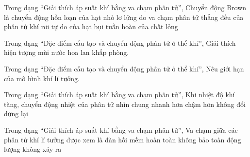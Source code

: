 \begin{ex}
Trong dạng “Giải thích áp suất khí bằng va chạm phân tử”, Chuyển động Brown là chuyển động
\choice
{\True hỗn loạn của hạt nhỏ lơ lửng do va chạm phân tử}
{thẳng đều của phân tử khí}
{rơi tự do của hạt bụi}
{tuần hoàn của chất lỏng}
\end{ex}

\begin{ex}
Trong dạng “Đặc điểm cấu tạo và chuyển động phân tử ở thể khí”, Giải thích hiện tượng mùi nước hoa lan khắp phòng.
\choiceTF

\end{ex}

\begin{ex}
Trong dạng “Đặc điểm cấu tạo và chuyển động phân tử ở thể khí”, Nêu giới hạn của mô hình khí lí tưởng.
\choiceTF

\end{ex}

\begin{ex}
Trong dạng “Giải thích áp suất khí bằng va chạm phân tử”, Khi nhiệt độ khí tăng, chuyển động nhiệt của phân tử nhìn chung
\choice
{\True nhanh hơn}
{chậm hơn}
{không đổi}
{dừng lại}
\end{ex}

\begin{ex}
Trong dạng “Giải thích áp suất khí bằng va chạm phân tử”, Va chạm giữa các phân tử khí lí tưởng được xem là
\choice
{\True đàn hồi}
{mềm hoàn toàn}
{không bảo toàn động lượng}
{không xảy ra}
\end{ex}

